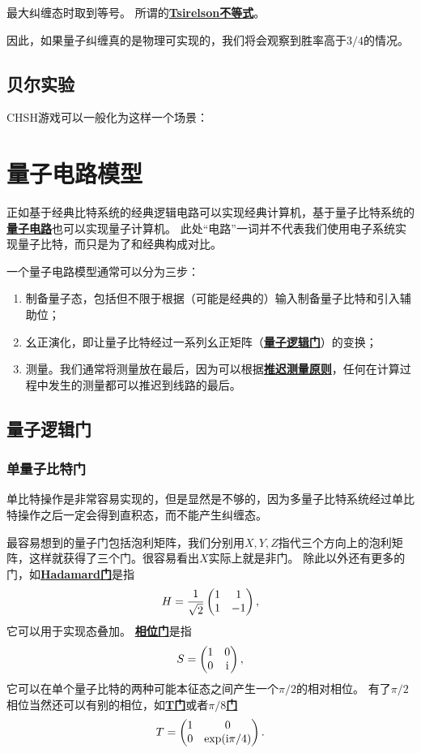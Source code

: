\documentclass[hyperref, UTF8, a4paper]{ctexart}
\newcommand*{\ii}{\mathrm{i}}
\newcommand*{\concept}[1]{\underline{\textbf{#1}}}
\begin{document}
最大纠缠态时取到等号。
所谓的\concept{Tsirelson不等式}。

因此，如果量子纠缠真的是物理可实现的，我们将会观察到胜率高于$3/4$的情况。

\subsection{贝尔实验}

CHSH游戏可以一般化为这样一个场景：

\section{量子电路模型}

正如基于经典比特系统的经典逻辑电路可以实现经典计算机，基于量子比特系统的\concept{量子电路}也可以实现量子计算机。
此处“电路”一词并不代表我们使用电子系统实现量子比特，而只是为了和经典构成对比。

一个量子电路模型通常可以分为三步：
\begin{enumerate}
    \item 制备量子态，包括但不限于根据（可能是经典的）输入制备量子比特和引入辅助位；
    \item 幺正演化，即让量子比特经过一系列幺正矩阵（\concept{量子逻辑门}）的变换；
    \item 测量。我们通常将测量放在最后，因为可以根据\concept{推迟测量原则}，任何在计算过程中发生的测量都可以推迟到线路的最后。
\end{enumerate}

\subsection{量子逻辑门}

\subsubsection{单量子比特门}

单比特操作是非常容易实现的，但是显然是不够的，因为多量子比特系统经过单比特操作之后一定会得到直积态，而不能产生纠缠态。

最容易想到的量子门包括泡利矩阵，我们分别用$X, Y, Z$指代三个方向上的泡利矩阵，这样就获得了三个门。很容易看出$X$实际上就是非门。
除此以外还有更多的门，如\concept{Hadamard门}是指
\begin{equation}
    H = \frac{1}{\sqrt{2}} \pmqty{1 & 1 \\ 1 & -1},
\end{equation}
它可以用于实现态叠加。
\concept{相位门}是指
\begin{equation}
    S = \pmqty{1 & 0 \\ 0 & \ii},
\end{equation}
它可以在单个量子比特的两种可能本征态之间产生一个$\pi/2$的相对相位。
有了$\pi/2$相位当然还可以有别的相位，如\concept{T门}或者\concept{$\pi/8$门}
\begin{equation}
    T = \pmqty{1 & 0 \\ 0 & \exp(\ii \pi / 4)}.
\end{equation}
\end{document}
